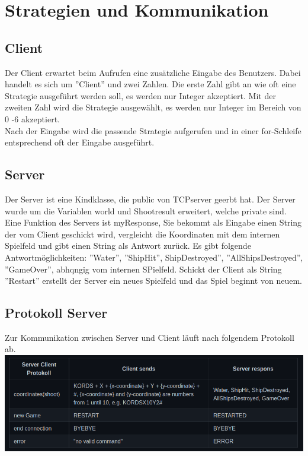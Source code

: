\section{Strategien und Kommunikation}

\subsection{Client}

Der Client erwartet beim Aufrufen eine zusätzliche Eingabe des Benutzers. Dabei handelt es sich um ''Client'' und zwei Zahlen. Die erste Zahl gibt an wie oft 
eine Strategie ausgeführt werden soll, es werden nur Integer akzeptiert. Mit der zweiten Zahl wird die Strategie ausgewählt, es werden nur Integer im Bereich von 
0 -6 akzeptiert. \\Nach der Eingabe wird die passende Strategie aufgerufen und in einer for-Schleife entsprechend oft der Eingabe ausgeführt.

\subsection{Server}

Der Server ist eine Kindklasse, die public von TCPserver geerbt hat. Der Server wurde um die Variablen world und Shootresult erweitert, welche private sind. 
Eine Funktion des Servers ist myResponse, Sie bekommt als Eingabe einen String der vom Client geschickt wird, 
vergleicht die Koordinaten mit dem internen Spielfeld und gibt einen String als Antwort zurück. Es gibt folgende Antwortmöglichkeiten: ''Water'', ''ShipHit'', 
ShipDestroyed'', ''AllShipsDestroyed'', ''GameOver'', abhqngig vom internen SPielfeld. Schickt der Client als String ''Restart'' erstellt der Server ein neues Spielfeld und das Spiel beginnt von neuem.

\subsection{Protokoll Server}
Zur Kommunikation zwischen Server und Client läuft nach folgendem Protokoll ab.\\
\includegraphics[scale=0.5]{ProtokollServer.png}\\

